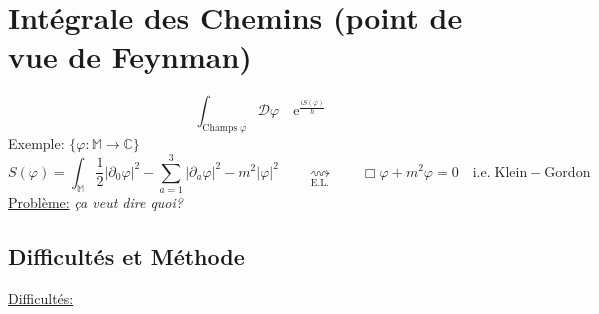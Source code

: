 \documentclass[a4paper,11pt]{article}
\newcommand{\D}{{\mathcal{D}}}
\newcommand{\e}{{\mathrm{e}}}
\begin{document}
\section{Intégrale des Chemins (point de vue de Feynman)}
$$\boxed{\boxed{\int_{\mathrm{Champs}\;\varphi}\!\!\!\!\!\!\!\!\!\!\!\!\!\!\!\D\varphi \quad\e^{\frac{iS(\varphi)}{\hbar}}}}$$
Exemple: $\{\varphi:\mathbb{M}\to\mathbb{C}\}$
$$S(\varphi) = \int_\mathbb{M}\frac{1}{2}|\partial_0 \varphi|^2 - \sum_{a=1}^3 |\partial_a \varphi|^2 - m^2 |\varphi|^2
\quad \quad \underset{\mathrm{E}.\mathrm{L}.}\rightsquigarrow \quad \quad
\Box \varphi + m^2 \varphi = 0 \quad \mathrm{i}.\mathrm{e}. \; \mathrm{Klein}-\mathrm{Gordon}$$
\underline{Problème:} \emph{ça veut dire quoi?}
\subsection{Difficultés et Méthode}
\noindent \underline{Difficultés:}
\end{document}
